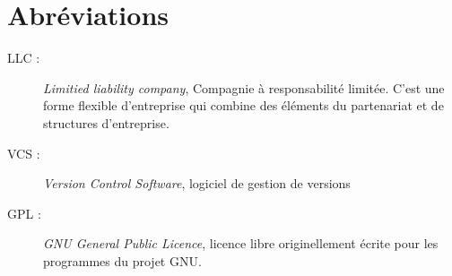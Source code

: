 \chapter*{Abréviations}

\begin{description}
    \item[LLC : ] \emph{Limitied liability company}, Compagnie à
        responsabilité limitée. C'est une forme flexible d'entreprise qui
        combine des éléments du partenariat et de structures d'entreprise.
    \item[VCS : ] \emph{Version Control Software}, logiciel de gestion de versions
    \item[GPL : ] \emph{GNU General Public Licence}, licence libre originellement
        écrite pour les programmes du projet GNU.

\end{description}
